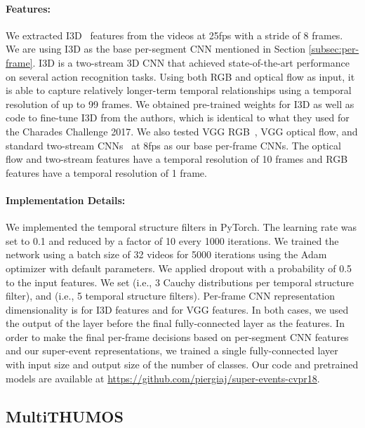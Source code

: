 \documentclass[10pt,twocolumn,letterpaper]{article}
\begin{document}
\paragraph{Features:}
We extracted I3D~\cite{carreira2017quo} features from the videos at 25fps with a stride of 8 frames. We are using I3D as the base per-segment CNN mentioned in Section \ref{subsec:per-frame}. I3D is a two-stream 3D CNN that achieved state-of-the-art performance on several action recognition tasks. Using both RGB and optical flow as input, it is able to capture relatively longer-term temporal relationships using a temporal resolution of up to 99 frames. We obtained pre-trained weights for I3D as well as code to fine-tune I3D from the authors, which is identical to what they used for the Charades Challenge 2017. We also tested VGG RGB~\cite{simonyan2014very}, VGG optical flow, and standard two-stream CNNs~\cite{feichtenhofer2016convolutional} at 8fps as our base per-frame CNNs. The optical flow and two-stream features have a temporal resolution of 10 frames and RGB features have a temporal resolution of 1 frame.


\vspace{-3pt}
\paragraph{Implementation Details:} We implemented the temporal structure filters in PyTorch. The learning rate was set to 0.1 and reduced by a factor of 10 every 1000 iterations. We trained the network using a batch size of 32 videos for 5000 iterations using the Adam~\cite{kingma2014adam} optimizer with default parameters. We applied dropout with a probability of 0.5 to the input features. We set  (i.e., 3 Cauchy distributions per temporal structure filter), and  (i.e., 5 temporal structure filters). Per-frame CNN representation dimensionality is  for I3D features and  for VGG features. In both cases, we used the output of the layer before the final fully-connected layer as the features. In order to make the final per-frame decisions based on per-segment CNN features and our super-event representations, we trained a single fully-connected layer with input size  and output size of the number of classes. Our code and pretrained models are available at \href{https://github.com/piergiaj/super-events-cvpr18}{https://github.com/piergiaj/super-events-cvpr18}.


\subsection{MultiTHUMOS}
\end{document}
